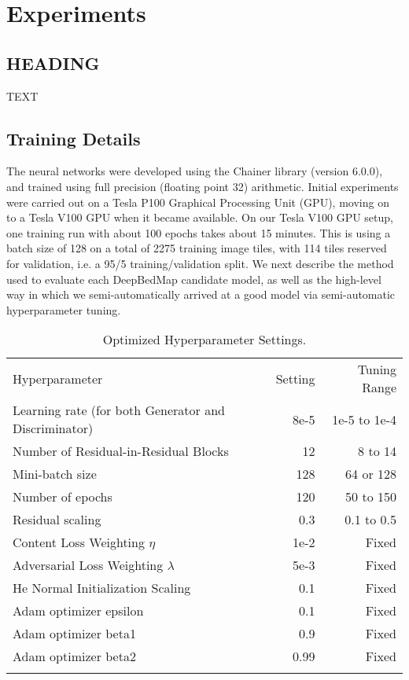 \documentclass[tc, manuscript]{copernicus}
\begin{document}
\section{Experiments}

\subsection{HEADING}
TEXT

\subsection{Training Details}

The neural networks were developed using the Chainer library (version 6.0.0), and trained using full precision (floating point 32) arithmetic.
Initial experiments were carried out on a Tesla P100 Graphical Processing Unit (GPU), moving on to a Tesla V100 GPU when it became available.
On our Tesla V100 GPU setup, one training run with about 100 epochs takes about 15 minutes.
This is using a batch size of 128 on a total of 2275 training image tiles, with 114 tiles reserved for validation, i.e. a 95/5 training/validation split.
We next describe the method used to evaluate each DeepBedMap candidate model, as well as the high-level way in which we semi-automatically arrived at a good model via semi-automatic hyperparameter tuning.

\begin{table*}[h]
\caption{Optimized Hyperparameter Settings.}
\label{table:1}
\begin{tabular}{lrr}
\tophline
Hyperparameter & Setting & Tuning Range \\
\middlehline
Learning rate (for both Generator and Discriminator) & 8e-5 & 1e-5 to 1e-4 \\
Number of Residual-in-Residual Blocks & 12 & 8 to 14 \\
Mini-batch size & 128 & 64 or 128 \\
Number of epochs & 120 & 50 to 150 \\
Residual scaling & 0.3 & 0.1 to 0.5 \\
Content Loss Weighting $\eta$ & 1e-2 & Fixed \\
Adversarial Loss Weighting $\lambda$ & 5e-3 & Fixed \\
He Normal Initialization Scaling & 0.1 & Fixed \\
Adam optimizer epsilon & 0.1 & Fixed \\
Adam optimizer beta1 & 0.9 & Fixed \\
Adam optimizer beta2 & 0.99 & Fixed \\
\bottomhline
\end{tabular}
\belowtable{} %
\end{table*}
\end{document}
